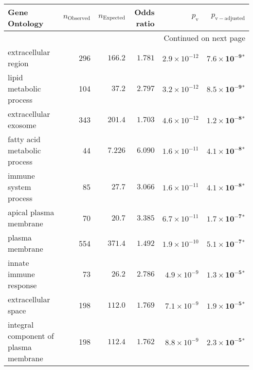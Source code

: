 \begin{longtable}{|l|r|r|r|r|r|}
\toprule
                                     Gene Ontology & $n_{\mathrm{Observed}}$ & $n_{\mathrm{Expected}}$ & Odds ratio &     $p_{\mathrm{v}}$ &     $p_{\mathrm{v-adjusted}}$ \\
\midrule
\endhead
\midrule
\multicolumn{6}{r}{{Continued on next page}} \\
\midrule
\endfoot

\bottomrule
\endlastfoot
                              extracellular region &                     296 &                $ 166.2$ &   $ 1.781$ & $2.9\times 10^{-12}$ &  $\bm{7.6\times 10^{-9}{^*}}$ \\
                           lipid metabolic process &                     104 &                $  37.2$ &   $ 2.797$ & $3.2\times 10^{-12}$ &  $\bm{8.5\times 10^{-9}{^*}}$ \\
                             extracellular exosome &                     343 &                $ 201.4$ &   $ 1.703$ & $4.6\times 10^{-12}$ &  $\bm{1.2\times 10^{-8}{^*}}$ \\
                      fatty acid metabolic process &                      44 &                $ 7.226$ &   $ 6.090$ & $1.6\times 10^{-11}$ &  $\bm{4.1\times 10^{-8}{^*}}$ \\
                             immune system process &                      85 &                $  27.7$ &   $ 3.066$ & $1.6\times 10^{-11}$ &  $\bm{4.1\times 10^{-8}{^*}}$ \\
                            apical plasma membrane &                      70 &                $  20.7$ &   $ 3.385$ & $6.7\times 10^{-11}$ &  $\bm{1.7\times 10^{-7}{^*}}$ \\
                                   plasma membrane &                     554 &                $ 371.4$ &   $ 1.492$ & $1.9\times 10^{-10}$ &  $\bm{5.1\times 10^{-7}{^*}}$ \\
                            innate immune response &                      73 &                $  26.2$ &   $ 2.786$ &  $4.9\times 10^{-9}$ &  $\bm{1.3\times 10^{-5}{^*}}$ \\
                               extracellular space &                     198 &                $ 112.0$ &   $ 1.769$ &  $7.1\times 10^{-9}$ &  $\bm{1.9\times 10^{-5}{^*}}$ \\
             integral component of plasma membrane &                     198 &                $ 112.4$ &   $ 1.762$ &  $8.8\times 10^{-9}$ &  $\bm{2.3\times 10^{-5}{^*}}$ \\

\end{longtable}

